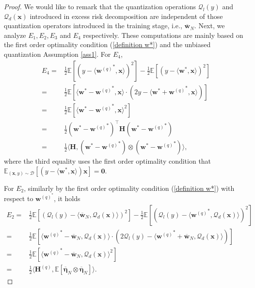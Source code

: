 \documentclass[11pt, letterpaper]{article}
\begin{document}
\begin{proof}
    We would like to remark that the quantization operations $\mathcal{Q}_l(y)$ and $\mathcal{Q}_d(\mathbf{x})$ introduced in excess risk decomposition are independent of those quantization operators introduced in the training stage, i.e., $\overline{\mathbf{w}}_N$. Next, we analyze $E_1,E_2,E_3$ and $E_4$ respectively. These computations are mainly based on the first order optimality condition (\ref{definition w*}) and the unbiased quantization Assumption \ref{ass1}. For $E_4$,
    \begin{equation}
        \label{eq: a3}
        \begin{aligned}
            E_4=&\frac{1}{2}\mathbb{E}\left[\left(y-\langle {\mathbf{w}^{(q)}}^*,\mathbf{x} \rangle \right)^2\right]-\frac{1}{2}\mathbb{E}\left[\left(y-\langle \mathbf{w}^*,\mathbf{x} \rangle \right)^2\right]\\
            =&\frac{1}{2}\mathbb{E}\left[\langle {\mathbf{w}}^*-{\mathbf{w}^{(q)}}^*,\mathbf{x} \rangle\cdot \left(2y-\langle {\mathbf{w}}^*+{\mathbf{w}^{(q)}}^*,\mathbf{x} \rangle\right)\right]\\
            =&\frac{1}{2}\mathbb{E}\left[\langle {\mathbf{w}}^*-{\mathbf{w}^{(q)}}^*,\mathbf{x} \rangle^2\right]\\
            =&\frac{1}{2}\left({\mathbf{w}}^*-{\mathbf{w}^{(q)}}^*\right)^\top \mathbf{H} \left({\mathbf{w}}^*-{\mathbf{w}^{(q)}}^*\right)\\
            =&\frac{1}{2}\langle\mathbf{H},({\mathbf{w}}^*-{\mathbf{w}^{(q)}}^*)\otimes({\mathbf{w}}^*-{\mathbf{w}^{(q)}}^*)\rangle,
        \end{aligned}
    \end{equation}
    where the third equality uses the first order optimality condition that $\mathbb{E}_{(\mathbf{x},y)\sim\mathcal{D}}[(y-\langle{\mathbf{w}}^*,\mathbf{x}\rangle)\mathbf{x}]=\mathbf{0}$.

    For $E_2$, similarly by the first order optimality condition (\ref{definition w*}) with respect to $\mathbf{w}^{(q)^*}$, it holds
    \begin{equation}
        \label{eq: a4}
        \begin{aligned}
            E_2=&\frac{1}{2}\mathbb{E}\left[(\mathcal{Q}_l(y)-\langle \overline{\mathbf{w}}_N,\mathcal{Q}_d(\mathbf{x})\rangle)^2\right]-\frac{1}{2}\mathbb{E}\left[(\mathcal{Q}_l(y)-\langle {\mathbf{w}^{(q)}}^*,\mathcal{Q}_d(\mathbf{x})\rangle)^2\right]\\
            =&\frac{1}{2}\mathbb{E}\left[\langle {\mathbf{w}^{(q)}}^*-\overline{\mathbf{w}}_N,\mathcal{Q}_d(\mathbf{x})\rangle \cdot \left(2\mathcal{Q}_l(y)-\langle {\mathbf{w}^{(q)}}^*+\overline{\mathbf{w}}_N,\mathcal{Q}_d(\mathbf{x}) \rangle\right) \right]\\
            =&\frac{1}{2}\mathbb{E}\left[\langle {\mathbf{w}^{(q)}}^*-\overline{\mathbf{w}}_N,\mathcal{Q}_d(\mathbf{x}) \rangle^2\right]\\
            =&\frac{1}{2}\langle\mathbf{H}^{(q)},\mathbb{E}[\overline{\boldsymbol{\eta}}_N\otimes\overline{\boldsymbol{\eta}}_N]\rangle.
        \end{aligned}
    \end{equation}


\end{proof}
\end{document}
